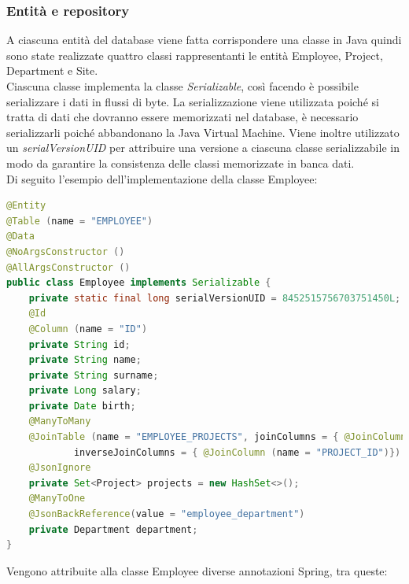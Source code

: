 \subsubsection*{Entità e repository}
A ciascuna entità del database viene fatta corrispondere una classe in Java quindi sono state realizzate quattro classi rappresentanti le entità Employee, Project, Department e Site.\\
Ciascuna classe implementa la classe \textit{Serializable}, così facendo è possibile serializzare i dati in flussi di byte. La serializzazione viene utilizzata poiché si tratta di dati che dovranno essere memorizzati nel database, è necessario serializzarli poiché abbandonano la Java Virtual Machine. Viene inoltre utilizzato un \textit{serialVersionUID} per attribuire una versione a ciascuna classe serializzabile in modo da garantire la consistenza delle classi memorizzate in banca dati.\\
Di seguito l'esempio dell'implementazione della classe Employee:
\begin{lstlisting}[language=Java, morecomment={[s][\color{DarkOrchid}]{\@}{\ }}, morecomment={[s][\color{OliveGreen}]{"}{"}},]
@Entity
@Table (name = "EMPLOYEE")
@Data
@NoArgsConstructor ()
@AllArgsConstructor ()
public class Employee implements Serializable {
    private static final long serialVersionUID = 8452515756703751450L;
    @Id
    @Column (name = "ID")
    private String id;
    private String name;
    private String surname;
    private Long salary;
    private Date birth;
    @ManyToMany
    @JoinTable (name = "EMPLOYEE_PROJECTS", joinColumns = { @JoinColumn (name = "EMPLOYEE_ID")},
            inverseJoinColumns = { @JoinColumn (name = "PROJECT_ID")})
    @JsonIgnore
    private Set<Project> projects = new HashSet<>();
    @ManyToOne
    @JsonBackReference(value = "employee_department")
    private Department department;
}
\end{lstlisting}
Vengono attribuite alla classe Employee diverse annotazioni Spring, tra queste:
